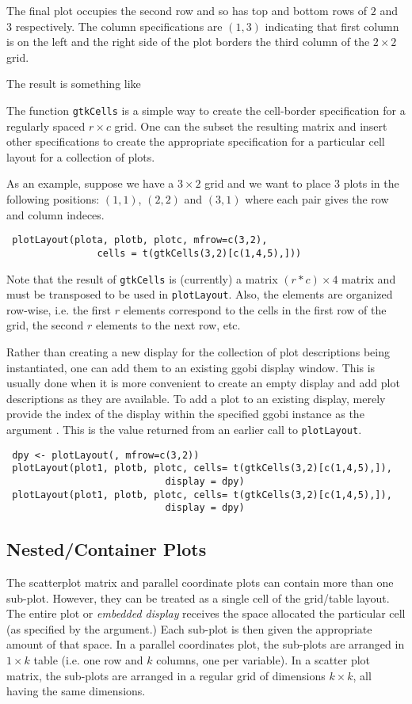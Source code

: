 \documentclass{article}
\def\SFunction#1{{\texttt{\red #1}}}
\begin{document}
The final plot occupies the second row and so has top and bottom rows
of $2$ and $3$ respectively.  The column specifications are $(1, 3)$
indicating that first column is on the left and the right side of the
plot borders the third column of the $2 \times 2$ grid.


The result is something like


The function \SFunction{gtkCells} is a simple way to create the
cell-border specification for a regularly spaced $r \times c$ grid.
One can the subset the resulting matrix and insert other
specifications to create the appropriate specification for a
particular cell layout for a collection of plots.

As an example, suppose we have a $3 \times 2$ grid and we want to
place $3$ plots in the following positions: $(1,1)$, $(2,2)$ and
$(3,1)$ where each pair gives the row and column indeces.
\begin{verbatim}
 plotLayout(plota, plotb, plotc, mfrow=c(3,2),
                cells = t(gtkCells(3,2)[c(1,4,5),]))
\end{verbatim}
Note that the result of \SFunction{gtkCells} is (currently) a matrix
$(r \ast c) \times 4$ matrix and must be transposed to be used in
\SFunction{plotLayout}.  Also, the elements are organized row-wise,
i.e.  the first $r$ elements correspond to the cells in the first row
of the grid, the second $r$ elements to the next row, etc.



Rather than creating a new display for the collection of plot
descriptions being instantiated, one can add them to an existing ggobi
display window. This is usually done when it is more convenient to
create an empty display and add plot descriptions as they are
available. To add a plot to an existing display, merely provide the
index of the display within the specified ggobi instance as the
argument .  This is the value returned from an earlier
call to \SFunction{plotLayout}.
\begin{verbatim}
 dpy <- plotLayout(, mfrow=c(3,2))
 plotLayout(plot1, plotb, plotc, cells= t(gtkCells(3,2)[c(1,4,5),]),
                            display = dpy)
 plotLayout(plot1, plotb, plotc, cells= t(gtkCells(3,2)[c(1,4,5),]),
                            display = dpy)
\end{verbatim}



\subsection{Nested/Container Plots}
The scatterplot matrix and parallel coordinate plots can contain more
than one sub-plot.  However, they can be treated as a single cell of
the grid/table layout. The entire plot or \textit{embedded display}
receives the space allocated the particular cell (as specified by the
 argument.)  Each sub-plot is then given the appropriate
amount of that space.  In a parallel coordinates plot, the sub-plots
are arranged in $1 \times k$ table (i.e. one row and $k$ columns, one
per variable).  In a scatter plot matrix, the sub-plots are arranged
in a regular grid of dimensions $k \times k$, all having the same
dimensions.
\end{document}

